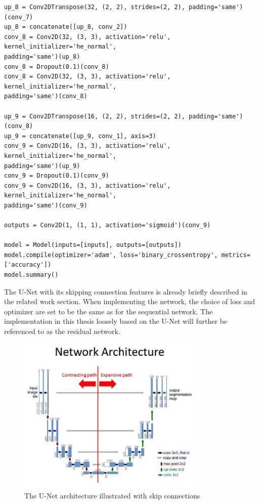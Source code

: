 \documentclass[USenglish]{ifimaster}  %
\begin{document}
\begin{verbatim}
up_8 = Conv2DTranspose(32, (2, 2), strides=(2, 2), padding='same')(conv_7)
up_8 = concatenate([up_8, conv_2])
conv_8 = Conv2D(32, (3, 3), activation='relu', kernel_initializer='he_normal', 
padding='same')(up_8)
conv_8 = Dropout(0.1)(conv_8)
conv_8 = Conv2D(32, (3, 3), activation='relu', kernel_initializer='he_normal', 
padding='same')(conv_8)

up_9 = Conv2DTranspose(16, (2, 2), strides=(2, 2), padding='same')(conv_8)
up_9 = concatenate([up_9, conv_1], axis=3)
conv_9 = Conv2D(16, (3, 3), activation='relu', kernel_initializer='he_normal', 
padding='same')(up_9)
conv_9 = Dropout(0.1)(conv_9)
conv_9 = Conv2D(16, (3, 3), activation='relu', kernel_initializer='he_normal', 
padding='same')(conv_9)

outputs = Conv2D(1, (1, 1), activation='sigmoid')(conv_9)

model = Model(inputs=[inputs], outputs=[outputs])
model.compile(optimizer='adam', loss='binary_crossentropy', metrics=['accuracy'])
model.summary()

\end{verbatim}

The U-Net with its skipping connection features is already briefly described in the related work section. When implementing the network, the choice of loss and optimizer are set to be the same as for the sequential network. The implementation in this thesis loosely based on the U-Net will further be referenced to as the residual network.

\begin{figure}[ht]
    \centering
    \includegraphics[width=0.8\textwidth]{bilder/u-net_architecture_method.png}
    \caption{The U-Net architecture illustrated with skip connections \cite{website:u-net_method}}
    \label{fig:u_net_method_chapter}
\end{figure}
\end{document}
